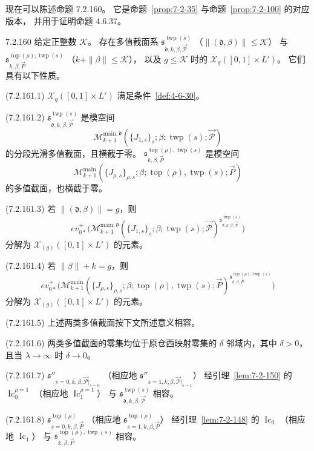 现在可以陈述命题 7.2.160。
它是命题~\ref{prop:7-2-35}
与命题~\ref{prop:7-2-100} 的对应版本，
并用于证明命题 4.6.37。
\begin{proposition}{7.2.160}\label{prop:7-2-160}
给定正整数 $\mathcal K$。
存在多值截面系
$\mathfrak s_{\mathfrak d,k,\beta,
\vec{\mathcal P}}^{\operatorname{twp}(s)}$
（$\|(\mathfrak d,\beta)\|\le\mathcal K$）
与
$\mathfrak s_{k,\beta,\vec P}^{
\operatorname{top}(\rho),\operatorname{twp}(s)}$
（$k+\|\beta\|\le\mathcal K$），
以及 $g\le\mathcal K$ 时的
$\mathcal X_g([0,1]\times L')$。
它们具有以下性质。

\noindent\textup{(7.2.161.1)}\quad
$\mathcal X_g([0,1]\times L')$
满足条件~\ref{def:4-6-30}。

\noindent\textup{(7.2.161.2)}\quad
$\mathfrak s_{\mathfrak d,k,\beta,
\vec{\mathcal P}}^{\operatorname{twp}(s)}$
是模空间
\[
\mathcal M_{k+1}^{\mathrm{main},\mathfrak d}
(\{J_{1,s}\}_s;\beta;
\operatorname{twp}(s);\vec{\mathcal P})
\]
的分段光滑多值截面，且横截于零。
$\mathfrak s_{k,\beta,\vec P}^{
\operatorname{top}(\rho),\operatorname{twp}(s)}$
是模空间
\[
\mathcal M_{k+1}^{\mathrm{main}}
(\{J_{\rho,s}\}_{\rho,s};\beta;
\operatorname{top}(\rho),\operatorname{twp}(s);\vec P)
\]
的多值截面，也横截于零。

\noindent\textup{(7.2.161.3)}\quad
若 $\|(\mathfrak d,\beta)\|=g$，则
\[
ev_{0*}^+\bigl(
\mathcal M_{k+1}^{\mathrm{main},\mathfrak d}
(\{J_{1,s}\}_s;\beta;
\operatorname{twp}(s);\vec{\mathcal P})^{
\mathfrak s_{\mathfrak d,k,\beta,
\vec{\mathcal P}}^{\operatorname{twp}(s)}}\bigr)
\]
分解为 $\mathcal X_{(g)}([0,1]\times L')$ 的元素。

\noindent\textup{(7.2.161.4)}\quad
若 $\|\beta\|+k=g$，则
\[
ev_{0*}^+\bigl(
\mathcal M_{k+1}^{\mathrm{main}}
(\{J_{\rho,s}\}_{\rho,s};\beta;
\operatorname{top}(\rho),\operatorname{twp}(s);\vec P)^{
\mathfrak s_{k,\beta,\vec P}^{
\operatorname{top}(\rho),\operatorname{twp}(s)}}\bigr)
\]
分解为 $\mathcal X_{(g)}([0,1]\times L')$ 的元素。

\noindent\textup{(7.2.161.5)}\quad
上述两类多值截面按下文所述意义相容。

\noindent\textup{(7.2.161.6)}\quad
两类多值截面的零集均位于原仓西映射零集的
$\delta$ 邻域内，其中 $\delta>0$，
且当 $\lambda\to\infty$ 时 $\delta\to0$。

\noindent\textup{(7.2.161.7)}\quad
$\mathfrak s''_{s=0,k,\beta,
\vec{\mathcal P}|_{s=0}}$
（相应地
$\mathfrak s''_{s=1,k,\beta,
\vec{\mathcal P}|_{s=1}}$）
经引理~\ref{lem:7-2-150} 的
$\operatorname{Ic}^{\rho=1}_0$
（相应地 $\operatorname{Ic}^{\rho=1}_1$）
与 $\mathfrak s_{\mathfrak d,k,\beta,
\vec{\mathcal P}}^{\operatorname{twp}(s)}$ 相容。

\noindent\textup{(7.2.161.8)}\quad
$\mathfrak s^{\operatorname{top}(\rho)}_{s=0,k,\beta,\vec P}$
（相应地
$\mathfrak s^{\operatorname{top}(\rho)}_{s=1,k,\beta,\vec P}$）
经引理~\ref{lem:7-2-148} 的
$\operatorname{Ic}_0$
（相应地 $\operatorname{Ic}_1$）
与 $\mathfrak s_{k,\beta,\vec P}^{
\operatorname{top}(\rho),\operatorname{twp}(s)}$ 相容。
\end{proposition}

